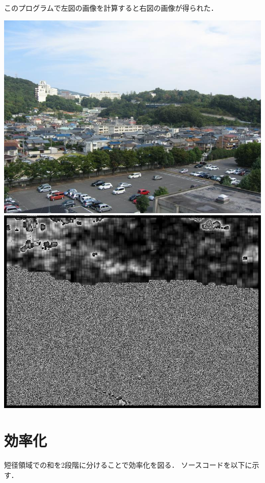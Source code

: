 \documentclass[11pt]{jarticle}
\begin{document}
このプログラムで左図の画像を計算すると右図の画像が得られた．

\includegraphics[scale=.3]{./img/0.jpg}
\includegraphics[scale=.4]{./img/out.jpg}

\section{効率化}

短径領域での和を2段階に分けることで効率化を図る．
ソースコードを以下に示す．
\end{document}
